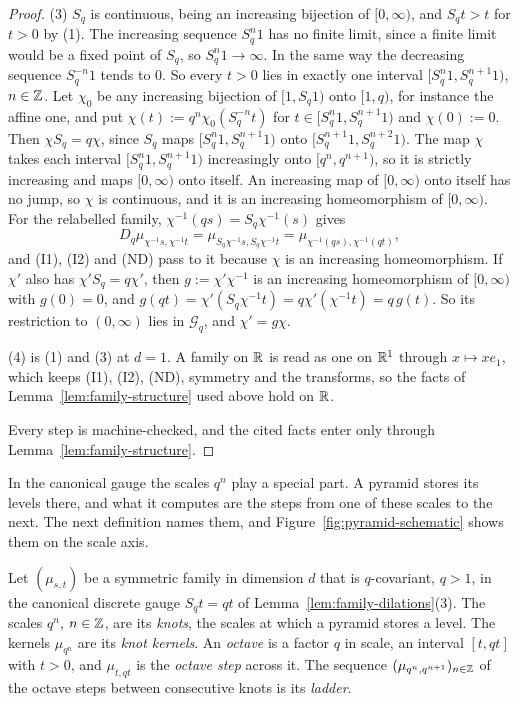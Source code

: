 \begin{proof}
(3) $S_q$ is continuous, being an increasing bijection of $[0,\infty)$, and $S_qt > t$ for $t > 0$
by (1). The increasing sequence $S_q^n1$ has no
finite limit, since a finite limit would be a fixed point of $S_q$, so $S_q^n1 \to \infty$. In the
same way the decreasing sequence $S_q^{-n}1$ tends to $0$. So every $t > 0$ lies in exactly one
interval $[S_q^n1, S_q^{n+1}1)$, $n \in \mathbb{Z}$. Let $\chi_0$ be any increasing bijection of
$[1, S_q1)$ onto $[1, q)$, for instance the affine one, and put $\chi(t) := q^n\chi_0(S_q^{-n}t)$ for
$t \in [S_q^n1, S_q^{n+1}1)$ and $\chi(0) := 0$. Then $\chi S_q = q\chi$, since $S_q$ maps
$[S_q^n1, S_q^{n+1}1)$ onto $[S_q^{n+1}1, S_q^{n+2}1)$. The map $\chi$ takes each interval
$[S_q^n1, S_q^{n+1}1)$ increasingly onto $[q^n, q^{n+1})$, so it is strictly increasing and maps
$[0,\infty)$ onto itself. An increasing map of $[0,\infty)$ onto itself has no jump, so $\chi$ is
continuous, and it is an increasing homeomorphism of $[0,\infty)$. For the relabelled family, $\chi^{-1}(qs) = S_q\chi^{-1}(s)$ gives
\[
  D_q\mu_{\chi^{-1}s, \chi^{-1}t} = \mu_{S_q\chi^{-1}s, S_q\chi^{-1}t} = \mu_{\chi^{-1}(qs), \chi^{-1}(qt)},
\]
and (I1), (I2) and (ND) pass to it because $\chi$ is an increasing homeomorphism. If $\chi'$ also has
$\chi'S_q = q\chi'$, then $g := \chi'\chi^{-1}$ is an increasing homeomorphism of $[0,\infty)$
with $g(0) = 0$, and $g(qt) = \chi'(S_q\chi^{-1}t) = q\chi'(\chi^{-1}t) = q\,g(t)$. So its
restriction to $(0,\infty)$ lies in $\mathcal{G}_q$, and $\chi' = g\chi$.

(4) is (1) and (3) at $d = 1$. A family on $\mathbb{R}$ is read as one on $\mathbb{R}^1$ through $x \mapsto xe_1$,
which keeps (I1), (I2), (ND), symmetry and the transforms, so the facts of
Lemma~\ref{lem:family-structure} used above hold on $\mathbb{R}$.

Every step is machine-checked, and the cited facts enter only through
Lemma~\ref{lem:family-structure}.
\end{proof}

In the canonical gauge the scales $q^n$ play a special part. A pyramid stores its levels there,
and what it computes are the steps from one of these scales to the next. The next definition names
them, and Figure~\ref{fig:pyramid-schematic} shows them on the scale axis.

\begin{definition}
\label{def:knots-and-ladder}

Let $(\mu_{s,t})$ be a symmetric family in dimension $d$ that is $q$-covariant, $q > 1$, in the
canonical discrete gauge $S_qt = qt$ of Lemma~\ref{lem:family-dilations}(3). The scales $q^n$,
$n \in \mathbb{Z}$, are its \emph{knots}, the scales at which a pyramid stores a level. The kernels
$\mu_{q^n}$ are its \emph{knot kernels}. An \emph{octave} is a factor $q$ in scale, an interval
$[t, qt]$ with $t > 0$, and $\mu_{t,qt}$ is the \emph{octave step} across it. The sequence
$(\mu_{q^n,q^{n+1}})_{n \in \mathbb{Z}}$ of the octave steps between consecutive knots is its \emph{ladder}.
\end{definition}

